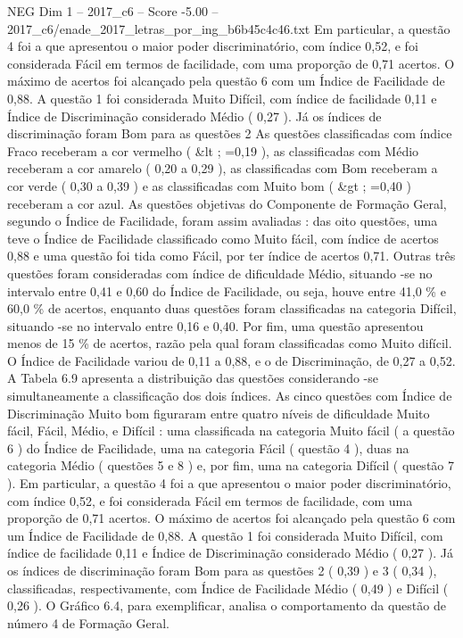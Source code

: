 \begin{textsample}{NEG Dim 1 – 2017\_c6 – Score -5.00 – 2017\_c6/enade\_2017\_letras\_por\_ing\_b6b45c4c46.txt}
Em particular, a questão 4 foi a que apresentou o maior poder discriminatório, com índice 0,52, e foi considerada Fácil em termos de facilidade, com uma proporção de 0,71 acertos.
O máximo de acertos foi alcançado pela questão 6 com um Índice de Facilidade de 0,88.
A questão 1 foi considerada Muito Difícil, com índice de facilidade 0,11 e Índice de Discriminação considerado Médio ( 0,27 ).
Já os índices de discriminação foram Bom para as questões 2 As questões classificadas com índice Fraco receberam a cor vermelho ( \&lt ; =0,19 ), as classificadas com Médio receberam a cor amarelo ( 0,20 a 0,29 ), as classificadas com Bom receberam a cor verde ( 0,30 a 0,39 ) e as classificadas com Muito bom ( \&gt ; =0,40 ) receberam a cor azul.
As questões objetivas do Componente de Formação Geral, segundo o Índice de Facilidade, foram assim avaliadas : das oito questões, uma teve o Índice de Facilidade classificado como Muito fácil, com índice de acertos 0,88 e uma questão foi tida como Fácil, por ter índice de acertos 0,71.
Outras três questões foram consideradas com índice de dificuldade Médio, situando -se no intervalo entre 0,41 e 0,60 do Índice de Facilidade, ou seja, houve entre 41,0 \% e 60,0 \% de acertos, enquanto duas questões foram classificadas na categoria Difícil, situando -se no intervalo entre 0,16 e 0,40.
Por fim, uma questão apresentou menos de 15 \% de acertos, razão pela qual foram classificadas como Muito difícil.
O Índice de Facilidade variou de 0,11 a 0,88, e o de Discriminação, de 0,27 a 0,52.
A Tabela 6.9 apresenta a distribuição das questões considerando -se simultaneamente a classificação dos dois índices.
As cinco questões com Índice de Discriminação Muito bom figuraram entre quatro níveis de dificuldade Muito fácil, Fácil, Médio, e Difícil : uma classificada na categoria Muito fácil ( a questão 6 ) do Índice de Facilidade, uma na categoria Fácil ( questão 4 ), duas na categoria Médio ( questões 5 e 8 ) e, por fim, uma na categoria Difícil ( questão 7 ).
Em particular, a questão 4 foi a que apresentou o maior poder discriminatório, com índice 0,52, e foi considerada Fácil em termos de facilidade, com uma proporção de 0,71 acertos.
O máximo de acertos foi alcançado pela questão 6 com um Índice de Facilidade de 0,88.
A questão 1 foi considerada Muito Difícil, com índice de facilidade 0,11 e Índice de Discriminação considerado Médio ( 0,27 ).
Já os índices de discriminação foram Bom para as questões 2 ( 0,39 ) e 3 ( 0,34 ), classificadas, respectivamente, com Índice de Facilidade Médio ( 0,49 ) e Difícil ( 0,26 ).
O Gráfico 6.4, para exemplificar, analisa o comportamento da questão de número 4 de Formação Geral.

\end{textsample}
